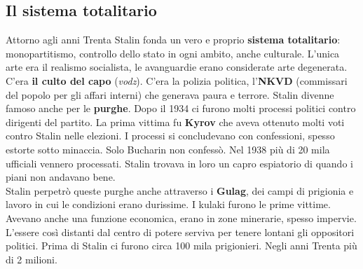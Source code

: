 \subsection{Il sistema totalitario}
Attorno agli anni Trenta Stalin fonda un vero e proprio \textbf{sistema totalitario}: monopartitismo,
controllo dello stato in ogni ambito, anche culturale. L'unica arte era il realismo socialista, le
avanguardie erano considerate arte degenerata. C'era \textbf{il culto del capo} (\textit{vodz}).
C'era la polizia politica,  l'\textbf{NKVD} (commissari del popolo per gli affari interni) che
generava paura e terrore. Stalin divenne famoso anche per le \textbf{purghe}. Dopo il 1934 ci furono
molti processi politici contro dirigenti del partito. La prima vittima fu \textbf{Kyrov} che aveva
ottenuto molti voti contro Stalin nelle elezioni. I processi si concludevano con confessioni, spesso
estorte sotto minaccia. Solo Bucharin non confessò. Nel 1938 più di 20 mila ufficiali vennero 
processati. Stalin trovava in loro un capro espiatorio di quando i piani non andavano bene.\\
Stalin perpetrò queste purghe anche attraverso i \textbf{Gulag}, dei campi di prigionia e lavoro
in cui le condizioni erano durissime. I kulaki furono le prime vittime. Avevano anche una funzione
economica, erano in zone minerarie, spesso impervie. L'essere così distanti dal centro di potere
serviva per tenere lontani gli oppositori politici. Prima di Stalin ci furono circa 100 mila 
prigionieri. Negli anni Trenta più di 2 milioni.

